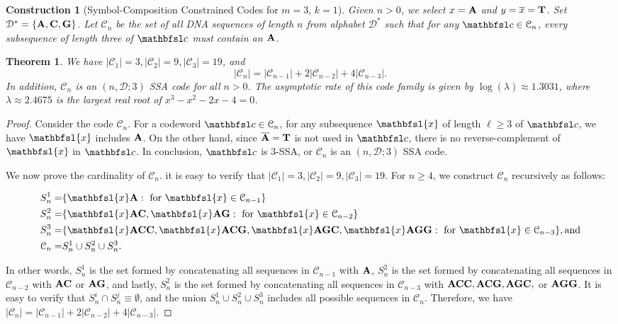\documentclass[conference]{IEEEtran}
\theoremstyle{plain}
\newtheorem{theorem}{Theorem}
\newtheorem{construction}{Construction}
\theoremstyle{definition}
\newcommand{\C}{{\mathcal C}}
\newcommand{\D}{{\mathcal D}}
\newcommand{\bc}{{\mathbfsl c}}
\newcommand{\bx}{{\mathbfsl{x}}}
\renewcommand{\ge}{\geqslant}
\begin{document}
\begin{construction}[Symbol-Composition Constrained Codes for $m=3$, $k=1$]\label{con2}
Given $n>0$, we select $x={\bf A}$ and $y=\overline{x}={\bf T}$. Set $\D^*=\{{\bf A}, {\bf C}, {\bf G}\}$. Let $\C_n$ be the set of all DNA sequences of length $n$ from alphabet $\D^*$ such that for any $\bc\in\C_n$, every subsequence of length three of $\bc$ must contain an ${\bf A}$. 
\end{construction}

\begin{theorem} We have $|\C_1|=3, |\C_2|=9,|\C_3|=19$, and
\begin{equation*}
|\C_n|= |\C_{n-1}| + 2| \C_{n-2}| + 4 |\C_{n-3}|.
\end{equation*}  
In addition, $\C_n$ is an $(n,\D;3)$ SSA code for all $n>0$. The asymptotic rate of this code family is given by $\log (\lambda) \approx 1.3031$, where $\lambda\approx 2.4675$ is the largest real root of $x^3-x^2-2x-4=0$.
\end{theorem}

\begin{proof}
Consider the code $\C_n$. For a codeword $\bc \in \C_n$, for any subsequence $\bx$ of length $\ell \ge 3$ of $\bc$, we have $\bx$ includes ${\bf A}$. On the other hand, since $\overline{\bf A}={\bf T}$ is not used in $\bc$, there is no reverse-complement of $\bx$ in $\bc$. In conclusion, $\bc$ is 3-SSA, or $\C_n$ is an $(n,\D;3)$ SSA code. 

We now prove the cardinality of  $\C_n$. it is easy to verify that $|\C_1|=3, |\C_2|=9,|\C_3|=19.$ For $n\ge 4$, we construct $\C_n$ recursively as
follows: 
\begin{small}
\begin{align*}
S^1_n=& \{ \bx {\bf A}: \text{ for } \bx \in \C_{n-1}\} \\
S^2_n=& \{ \bx {\bf A} {\bf C},  \bx {\bf A} {\bf G}: \text{ for } \bx \in \C_{n-2}\} \\
S^3_n=& \{ \bx {\bf A} {\bf C} {\bf C}, \bx {\bf A} {\bf C} {\bf G}, \bx {\bf A} {\bf G} {\bf C}, \bx {\bf A} {\bf G} {\bf G}: \text{ for } \bx \in \C_{n-3}\}, \text{and} \\
\C_n =& S^1_n \cup S^2_n \cup S^3_n.
\end{align*}
\end{small}
In other words, $S^1_n$ is the set formed by concatenating all sequences in $\C_{n-1}$ with ${\bf A}$, $S^2_n$ is the set formed by concatenating all sequences in $\C_{n-2}$ with ${\bf A}{\bf C}$ or ${\bf A}{\bf G}$, and lastly, $S^2_n$ is the set formed by concatenating all sequences in $\C_{n-3}$ with ${\bf A} {\bf C} {\bf C}, {\bf A} {\bf C} {\bf G}, {\bf A} {\bf G} {\bf C},$ or ${\bf A} {\bf G} {\bf G}$. It is easy to verify that $S^i_n \cap S^j_n\equiv \emptyset$, and the union $S^1_n \cup S^2_n \cup S^3_n$ includes all possible sequences in $\C_n$. Therefore, we have $|\C_n|= |\C_{n-1}| + 2| \C_{n-2}| + 4 |\C_{n-3}|.$
\end{proof}
\end{document}
